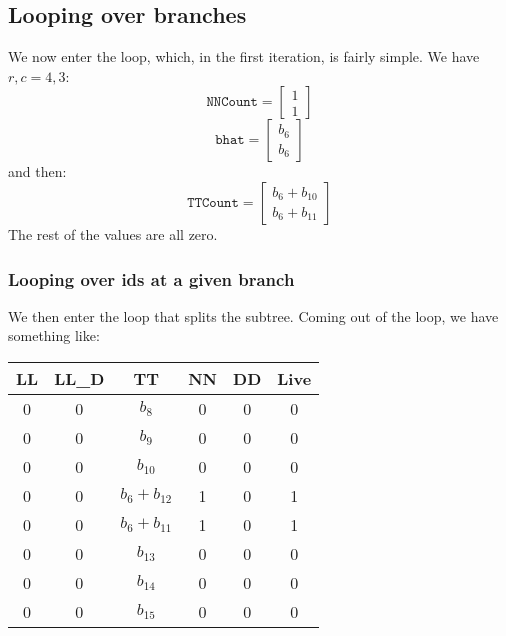 \documentclass[11pt]{article}
\begin{document}
\begin{tiny}
\subsection{Looping over branches}
We now enter the loop, which, in the first iteration, is fairly simple. We have $r,c=4,3$:
\begin{equation*}
\texttt{NNCount}=\left[\begin{array}{c} 1 \\ 1 \end{array} \right]
\end{equation*}
\begin{equation*}
\texttt{bhat}=\left[\begin{array}{c} b_6 \\ b_6 \end{array} \right]
\end{equation*}
and then:
\begin{equation*}
\texttt{TTCount}=\left[\begin{array}{c} b_6 +b_{10}\\ b_6+b_{11} \end{array} \right]
\end{equation*}
The rest of the values are all zero. 
\subsubsection{Looping over ids at a given branch}
We then enter the loop that splits the subtree. Coming out of the loop, we have something like:
\begin{center}
\begin{tabular}{cccccc}
\hline
LL  & LL\_D  & TT  & NN & DD  & Live \\
\hline
0   & 0     & $b_8$   & 0  & 0   & 0 \\
0   & 0     & $b_9$   & 0  & 0   & 0 \\
0   & 0     & $b_10$   & 0  & 0   & 0 \\
0   & 0     & $b_6 + b_{12}$   & 1  & 0   & 1 \\
0   & 0     & $b_6 + b_{11}$   & 1  & 0   & 1 \\
0   & 0     & $b_13$   & 0  & 0   & 0 \\
0   & 0     & $b_14$   & 0  & 0   & 0 \\
0   & 0     & $b_15$   & 0  & 0   & 0 \\
\hline
\end{tabular}
\end{center}


\end{tiny}
\end{document}

